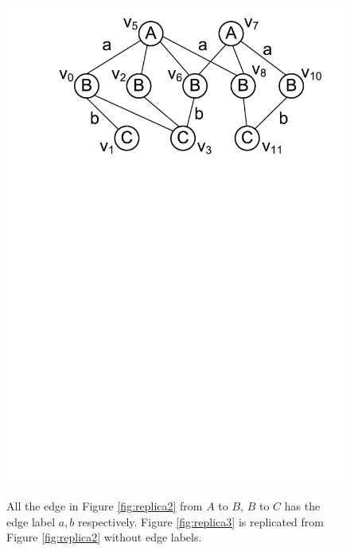 \begin{figure}[h!]
{\includegraphics[scale=0.30]{images/replica2}
\label{fig:replica2}
}
\vspace{-2mm}
\caption{\scriptsize All the edge in Figure \ref{fig:replica2} from $A$ to $B$, $B$ to $C$ has the edge label $a,b$ respectively. Figure \ref{fig:replica3} is replicated from Figure \ref{fig:replica2} without edge labels.}
\label{fig:replica}
\vspace{-6mm}
\end{figure}
